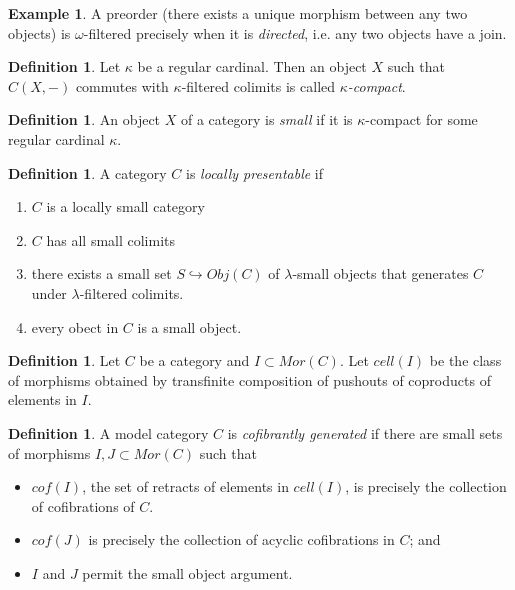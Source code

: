 \documentclass[letterpaper]{article}
\theoremstyle{definition}
\newtheorem{example}[lemma]{Example}
\newtheorem{definition}[lemma]{Definition}
\begin{document}
\begin{example}
A preorder (there exists a unique morphism between any two objects) is
$\omega$-filtered precisely when it is \emph{directed}, i.e. any two objects
have a join.
\end{example}

\begin{definition}
Let $\kappa$ be a regular cardinal. Then an object $X$ such that
$C(X,-)$ commutes with $\kappa$-filtered colimits is called \emph{$\kappa$-compact}.
\end{definition}

\begin{definition}
An object $X$ of a category is \emph{small} if it is $\kappa$-compact
for some regular cardinal $\kappa$.
\end{definition}

\begin{definition}
A category $C$ is \emph{locally presentable} if
\begin{enumerate}
\item $C$ is a locally small category
\item $C$ has all small colimits
\item there exists a small set $S\hookrightarrow Obj(C)$ of
  $\lambda$-small objects that generates $C$ under $\lambda$-filtered
  colimits.
\item every obect in $C$ is a small object.
\end{enumerate}
\end{definition}

\begin{definition}
Let $C$ be a category and $I \subset Mor(C)$. Let \emph{$cell(I)$} be
  the class of morphisms obtained by transfinite composition of
  pushouts of coproducts of elements in $I$.
\end{definition}

\begin{definition}
A model category $C$ is \emph{cofibrantly generated} if there are
small sets of morphisms $I,J \subset Mor(C)$ such that
\begin{itemize}
\item $cof(I)$, the set of retracts of elements in $cell(I)$, is
  precisely the collection of cofibrations of $C$.
\item $cof(J)$ is precisely the collection of acyclic cofibrations in
  $C$; and
\item $I$ and $J$ permit the small object argument.
\end{itemize}
\end{definition}
\end{document}
